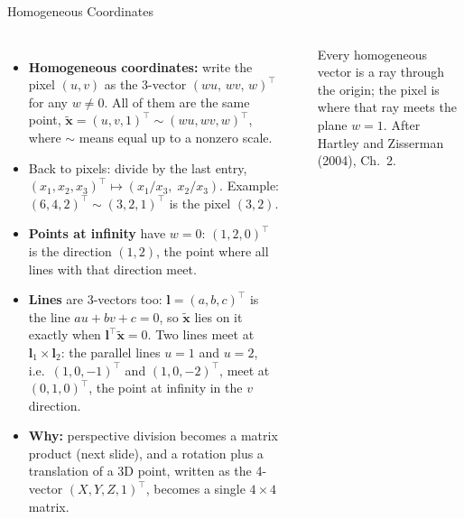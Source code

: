 \begin{frame}{Homogeneous Coordinates}
  \begin{columns}[T,onlytextwidth]
      \begin{itemize}\footnotesize\itemsep0.3em
        \item \textbf{Homogeneous coordinates:} write the pixel $(u,v)$ as the 3-vector $(wu,\,wv,\,w)^\top$ for any $w\neq0$. All of them are the same point, $\tilde{\mathbf{x}}=(u,v,1)^\top\sim(wu,wv,w)^\top$, where $\sim$ means equal up to a nonzero scale.
        \item Back to pixels: divide by the last entry, $(x_1,x_2,x_3)^\top\mapsto(x_1/x_3,\;x_2/x_3)$. Example: $(6,4,2)^\top\sim(3,2,1)^\top$ is the pixel $(3,2)$.
        \item \textbf{Points at infinity} have $w=0$: $(1,2,0)^\top$ is the direction $(1,2)$, the point where all lines with that direction meet.
        \item \textbf{Lines} are 3-vectors too: $\mathbf{l}=(a,b,c)^\top$ is the line $au+bv+c=0$, so $\tilde{\mathbf{x}}$ lies on it exactly when $\mathbf{l}^\top\tilde{\mathbf{x}}=0$. Two lines meet at $\mathbf{l}_1\times\mathbf{l}_2$: the parallel lines $u=1$ and $u=2$, i.e.\ $(1,0,-1)^\top$ and $(1,0,-2)^\top$, meet at $(0,1,0)^\top$, the point at infinity in the $v$ direction.
        \item \textbf{Why:} perspective division becomes a matrix product (next slide), and a rotation plus a translation of a 3D point, written as the 4-vector $(X,Y,Z,1)^\top$, becomes a single $4\times4$ matrix.
      \end{itemize}
      \centering
      \vspace{0.3em}
      \\[0.4em]
      {\scriptsize Every homogeneous vector is a ray through the origin; the pixel is where that ray meets the plane $w=1$. After Hartley and Zisserman (2004), Ch.~2.\par}
  \end{columns}
\end{frame}

